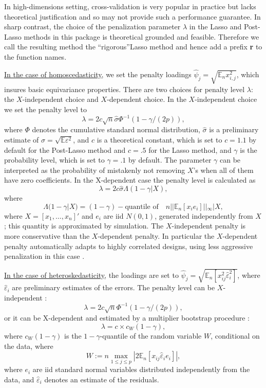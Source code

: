 \documentclass{amsart}\usepackage[]{graphicx}\usepackage[]{color}
\begin{document}
In high-dimensions setting, cross-validation is very popular in practice but lacks theoretical justification and so may not provide such a performance guarantee. In sharp contrast, the choice of the penalization parameter $\lambda$ in the Lasso and Post-Lasso methods in this package is theoretical grounded and feasible. Therefore we call the resulting method the \textquotedblleft rigorous\textquotedblright  Lasso method and hence add a prefix \textbf{r} to the function names.

\underline{In the case of homoscedasticity}, we set the penalty loadings $\hat{\psi}_j = \sqrt{\mathbb{E}_n x_{i,j}^2}$, which insures basic equivariance properties. There are two choices for penalty level $\lambda$:  the $X$-independent choice
and $X$-dependent choice.  In the $X$-independent choice we set the penalty level
to
\[ \lambda = 2c \sqrt{n} \hat{\sigma} \Phi^{-1}(1-\gamma/(2p)), \]
where $\Phi$ denotes the cumulative standard normal distribution, 
 $\hat \sigma$ is a preliminary estimate of $\sigma = \sqrt{\mathbb{E} \varepsilon^2}$,
and $c$ is a theoretical constant, which is set to $c=1.1$ by default for the Post-Lasso method and $c=.5$ for the Lasso method, and $\gamma$ is the probability level, which is set to $\gamma =.1$ by default.   The parameter $\gamma$ can be interpreted as the probability of mistakenly not removing $X$'s when all of them have zero coefficients.   In the X-dependent case the penalty level is calculated as
\[ \lambda = 2c \hat{\sigma} \Lambda(1-\gamma|X), \]
where
\[ \Lambda(1-\gamma|X)=(1-\gamma)-\text{quantile of}\quad n||\mathbb{E}_n[x_i e_i] ||_{\infty}|X,\]
where $X=[x_1, \ldots, x_n]'$ and $e_i$ are iid $N(0,1)$, generated independently from $X$; this quantity  is approximated by simulation. The $X$-independent penalty is more conservative than the $X$-dependent penalty. In particular the $X$-dependent penalty automatically adapts to highly correlated designs, using less aggressive penalization in this case \citet{BCH2011:InferenceGauss}.

\underline{In the case of heteroskedasticity}, the loadings are set to $\hat{\psi}_j=\sqrt{\mathbb{E}_n[x_{ij}^2 \hat \varepsilon_i^2]}$, where $\hat \varepsilon_i$ are preliminary estimates of the errors. The penalty level
can be $X$-independent \citep{BCCH12}:
\[ \lambda = 2c \sqrt{n} \Phi^{-1} (1-\gamma/(2p)), \]
or it can be X-dependent and estimated by a multiplier bootstrap procedure \citep{CCK:AOS13}:
\[ \lambda = c \times c_W(1-\gamma), \]
where $c_W(1-\gamma)$ is the $1-\gamma$-quantile of the random variable $W$, conditional on the data, where
\[ W:= n \max_{1 \leq j \leq p} |2\mathbb{E}_n [x_{ij} \hat{\varepsilon}_i e_i]|,\]
where $e_i$ are iid standard normal variables distributed independently from the data, and $ \hat{\varepsilon}_i$ denotes an estimate of the residuals.
\end{document}
